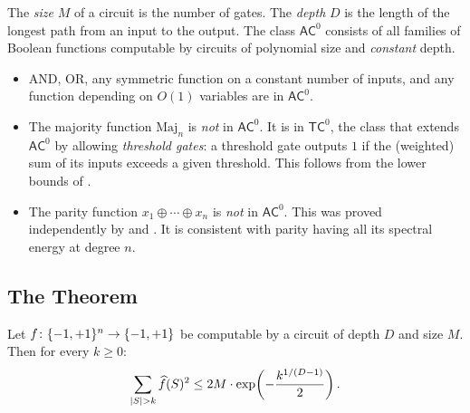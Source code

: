 The \emph{size} $M$ of a circuit is the number of gates. The
\emph{depth} $D$ is the length of the longest path from an input to the
output. The class $\mathsf{AC}^0$ consists of all families of Boolean
functions computable by circuits of polynomial size and \emph{constant}
depth.

\begin{example}\label{ex:ac0}
\begin{itemize}
  \item AND, OR, any symmetric function on a constant number of inputs,
    and any function depending on $O(1)$ variables are in $\mathsf{AC}^0$.
  \item The majority function $\text{Maj}_n$ is \emph{not} in
    $\mathsf{AC}^0$. It is in $\mathsf{TC}^0$, the class that
    extends $\mathsf{AC}^0$ by allowing \emph{threshold gates}:
    a threshold gate outputs $1$ if the (weighted) sum of its
    inputs exceeds a given threshold. This follows from the lower
    bounds of \citet{razborov1987lower}.
  \item The parity function $x_1 \oplus \cdots \oplus x_n$ is
    \emph{not} in $\mathsf{AC}^0$. This was proved independently by
    \citet{furst1984parity} and \citet{ajtai1983sigma11}. It is
    consistent with parity having all its spectral energy at
    degree $n$.
\end{itemize}
\end{example}

\subsection{The Theorem}

\begin{theorem}\label{thm:lmn}
Let $f \colon \{-1,+1\}^n \to \{-1,+1\}$ be computable by a circuit of depth $D$
and size $M$. Then for every $k \geq 0$:
\begin{equation}\label{eq:lmn}
  \sum_{|S| > k} \widehat{f}(S)^2 \leq 2M \cdot \exp\!\left(-\frac{k^{1/(D-1)}}{2}\right).
\end{equation}
\end{theorem}

